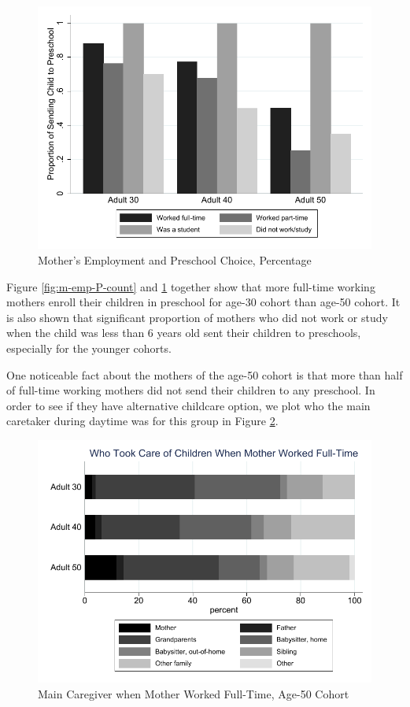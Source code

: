\documentclass[12pt]{article}
\begin{document}
\begin{figure}[H] \caption{Mother's Employment and Preschool Choice, Percentage} \label{fig:m-emp-P-perc}
\centering
\includegraphics[scale=0.9]{../../../../output/image/bar_momworkpreschool_mean.pdf}
\end{figure}

Figure \ref{fig:m-emp-P-count} and \ref{fig:m-emp-P-perc} together show that more full-time working mothers enroll their children in preschool for age-30 cohort than age-50 cohort. It is also shown that significant proportion of mothers who did not work or study when the child was less than 6 years old sent their children to preschools, especially for the younger cohorts. 

One noticeable fact about the mothers of the age-50 cohort is that more than half of full-time working mothers did not send their children to any preschool. In order to see if they have alternative childcare option, we plot who the main caretaker during daytime was for this group in Figure \ref{fig:m-maincg}. 

\begin{figure}[H] \caption{Main Caregiver when Mother Worked Full-Time, Age-50 Cohort} \label{fig:m-maincg}
\centering
\includegraphics[scale=0.9]{../../../../output/image/bar_caregiver_momft.pdf}
\end{figure}
\end{document}
